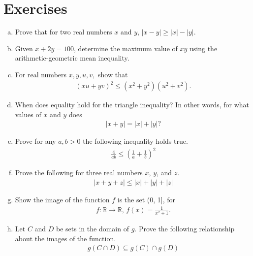 \documentclass[twoside]{report}
\begin{document}
\section{Exercises}

\begin{enumerate}[(a)]
	\setlength\itemsep{\baselineskip}
	\item  Prove that for two real numbers $x$ and $y$, $|x - y| \ge |x| - |y|$.
	
	\item Given $x + 2y = 100$, determine the maximum value of $xy$ using the arithmetic-geometric mean inequality.
	
	\item For real numbers $x, y, u, v,$ show that 
	\begin{align*}
		(xu + yv)^2 \le (x^2 + y^2)(u^2 + v^2).
	\end{align*}

	\item When does equality hold for the triangle inequality? In other words, for what values of $x$ and $y$ does 
	\begin{align*}
		|x + y| = |x| + |y|?
	\end{align*}

	\item Prove for any $a, b > 0$ the following inequality holds true.
	\begin{align*}
		\frac{4}{ab} \le \left( \frac{1}{a} + \frac{1}{b} \right)^2	
	\end{align*}

	\item Prove the following for three real numbers $x$, $y$, and $z$.
	\begin{align*}
		|x + y + z| \le |x| + |y| + |z|
	\end{align*}
	
	\item Show the image of the function $f$ is the set (0, 1], for
	\begin{align*}
		f: \mathbb{R} \rightarrow \mathbb{R}, \, f(x) = \frac{1}{x^2 + 1}.
	\end{align*}
	
	\item Let $C$ and $D$ be sets in the domain of $g$. Prove the following relationship about the images of the function.
	\begin{align*}
		g(C \cap D) \subseteq g(C) \cap g(D)
	\end{align*}
	

\end{enumerate}
\end{document}
